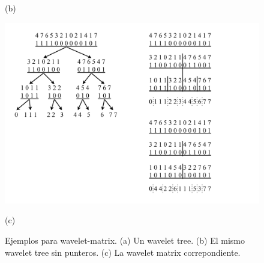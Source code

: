 \begin{frame}
\begin{figure}
\begin{minipage}{0.3\textwidth}
    		(b)
    	\end{minipage}
    	\begin{minipage}{0.3\textwidth}
    		\centering
    		\includegraphics[scale=.3, clip, trim=470 33 170 317]{../img/arte/graphs-wavelet-matrix.pdf}

    		(c)
    	\end{minipage}

    \caption{Ejemplos para wavelet-matrix. (a) Un wavelet tree. (b) El mismo wavelet tree sin punteros. (c) La wavelet matrix correpondiente.}
\end{figure}

\end{frame}